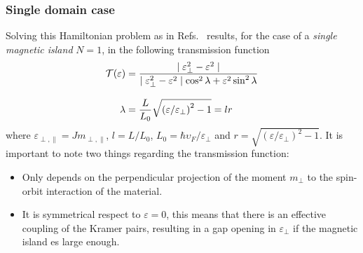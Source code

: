 \subsubsection{Single domain case}
Solving this Hamiltonian problem as in Refs.~\cite{BustosMarun2013,Gresta2019,Gresta2021PhD} results, for the case of a \textit{single magnetic island} $N=1$, in the following transmission function 
\begin{align}
    \label{eq:teo:transFuncQSH}
    \mathcal{T}(\varepsilon) &= \frac{\mid \varepsilon^2_\perp - \varepsilon^2 \mid}{\mid \varepsilon^2_\perp - \varepsilon^2 \mid \cos^2{\lambda} + \varepsilon^2 \sin^2{\lambda}}\\[2ex]
    \lambda &= \frac{L}{L_0}\sqrt{\left( \varepsilon/\varepsilon_{\perp} \right)^2-1} = lr 
\end{align}
where $\varepsilon_{\perp, \parallel} = J m_{\perp, \parallel}$, $l = L/L_0$, $L_0 = \hbar \upsilon_F/\varepsilon_{\perp}$ and  $r=\sqrt{\left( \varepsilon/\varepsilon_{\perp} \right)^2-1}$. It is important to note two things regarding the transmission function:
\begin{itemize}
    \item Only depends on the perpendicular projection of the moment $m_{\perp}$ to the spin-orbit interaction of the material. 
    \item It is symmetrical respect to $\varepsilon =0$, this means that there is an effective coupling of the Kramer pairs, resulting in a gap opening in $\varepsilon_{\perp}$ if the magnetic island es large enough.
\end{itemize}

